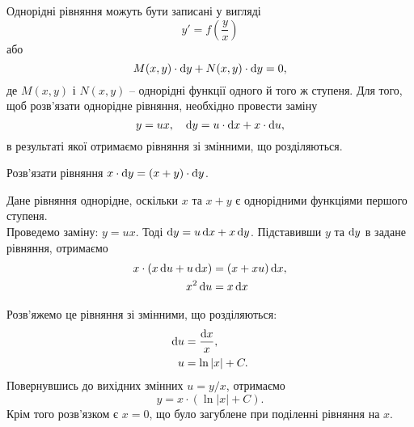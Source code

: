 Однорідні рівняння можуть бути записані у вигляді \[y' = f \left( \frac{y}{x} \right)\] або  \[ M(x, y)\cdot\mathop{}\!\mathrm{d} y + N(x, y) \cdot \mathop{}\!\mathrm{d} y = 0, \] де $M(x, y)$ і $N(x, y)$ -- однорідні функції одного й того ж ступеня. Для того, щоб розв’язати однорідне рівняння, необхідно провести заміну \[y = u x, \quad \mathop{}\!\mathrm{d} y = u \cdot \mathop{}\!\mathrm{d} x + x \cdot \mathop{}\!\mathrm{d} u,\] в результаті якої отримаємо рівняння зі змінними, що розділяються. 

\begin{example}
	Розв’язати рівняння $x \cdot \mathop{}\!\mathrm{d} y = (x + y) \cdot \mathop{}\!\mathrm{d} y$. 
\end{example}

\begin{solution}
	Дане рівняння однорідне, оскільки $x$ та $x + y$ є однорідними функціями першого ступеня. \\

	Проведемо заміну: $y = u x$. Тоді $\mathop{}\!\mathrm{d} y = u \mathop{}\!\mathrm{d} x + x \mathop{}\!\mathrm{d} y$. Підставивши $y$ та $\mathop{}\!\mathrm{d} y$ в задане рівняння, отримаємо  
	\begin{align*}
		x \cdot (x \mathop{}\!\mathrm{d} u + u \mathop{}\!\mathrm{d} x) &= (x + x u) \mathop{}\!\mathrm{d} x, \\
		x^2 \mathop{}\!\mathrm{d} u &= x \mathop{}\!\mathrm{d} x
	\end{align*}

	Розв’яжемо це рівняння зі змінними, що розділяються:
	\begin{align*}
		\mathop{}\!\mathrm{d} u &= \frac{\mathop{}\!\mathrm{d} x}{x}, \\
		u &= \ln |x| + C.
	\end{align*}
	Повернувшись до вихідних змінних $u = y / x$, отримаємо \[y = x \cdot (\ln |x| + C).\] Крім того розв’язком є $x = 0$, що було загублене при поділенні рівняння на $x$.
\end{solution}


